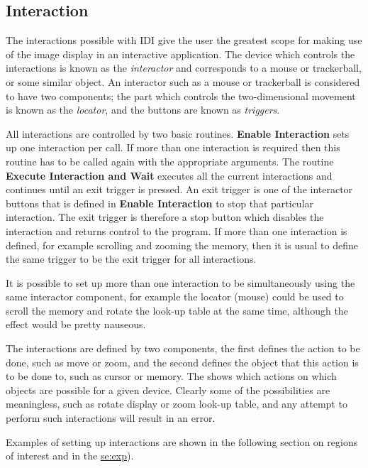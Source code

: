\subsection{Interaction}

The interactions possible with IDI give the user the greatest scope for
making use of the image display in an interactive application. The
device which controls the interactions is known as the {\it interactor}
and corresponds to a mouse or trackerball, or some similar object.
An interactor such as a mouse or trackerball is considered to have two
components; the part which controls the two-dimensional movement is
known as the {\it locator}, and the buttons are known as {\it triggers}.

All interactions are controlled by two basic routines. {\bf Enable
Interaction} sets up one interaction per call. If more than one
interaction is required then this routine has to be called again with
the appropriate arguments. The routine {\bf Execute Interaction and
Wait} executes all the current interactions and continues until an exit
trigger is pressed. An exit trigger is one of the interactor buttons that
is defined in {\bf Enable Interaction} to stop that particular interaction.
The exit trigger is therefore a stop button which disables the interaction
and returns control to the program.
If more than one interaction is defined, for example scrolling and zooming
the memory, then it is usual to define the same trigger to be the exit
trigger for all interactions.

It is possible to set up more than one interaction to be simultaneously
using the same interactor component, for example the locator (mouse)
could be used to scroll the memory and rotate the look-up table at the
same time, although the effect would be pretty nauseous.

The interactions are defined by two components, the first defines the
action to be done, such as move or zoom, and the second defines the object
that this action is to be done to, such as cursor or memory.
The 
shows which actions on which objects are possible for a given
device. Clearly some of the possibilities are meaningless, such as rotate
display or zoom look-up table, and any attempt to perform such interactions
will result in an error.

Examples of setting up interactions are shown in the following section on
regions of interest and in the
\hyperref{example program}{example program (appendix~}{}{se:exp}).

